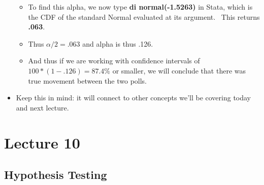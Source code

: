 \documentclass[11pt]{article}
\begin{document}
\begin{itemize}
\begin{itemize}
\item To find this alpha, we now type \textbf{di normal(-1.5263)} in Stata,
which is the CDF of the standard Normal evaluated at its argument. \ This
returns \textbf{.063}. \ 

\item Thus $\alpha /2=.063$ and alpha is thus .126. \ 

\item And thus if we are working with confidence intervals of $100\ast
(1-.126)=87.4\%$ or smaller, we will conclude that there was true movement
between the two polls.
\end{itemize}

\item Keep this in mind: it will connect to other concepts we'll be covering
today and next lecture.
\end{itemize}

\section{\protect\bigskip Lecture 10}

\subsection{Hypothesis Testing}
\end{document}
